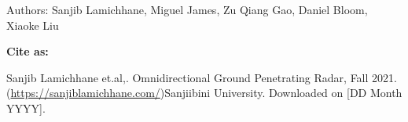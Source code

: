 \pagestyle{empty}
\textsc Authors: Sanjib Lamichhane, Miguel James, Zu Qiang Gao, Daniel Bloom, Xiaoke Liu \\

\doclicenseThis
\vspace{5in}
%
%
\begin{center}
	\textbf{Cite as:}
\end{center}
Sanjib Lamichhane et.al,. Omnidirectional Ground Penetrating Radar, Fall 2021. (\href{https://sanjiblamichhane.com}{https://sanjiblamichhane.com/})Sanjiibini University. Downloaded on [DD Month YYYY].